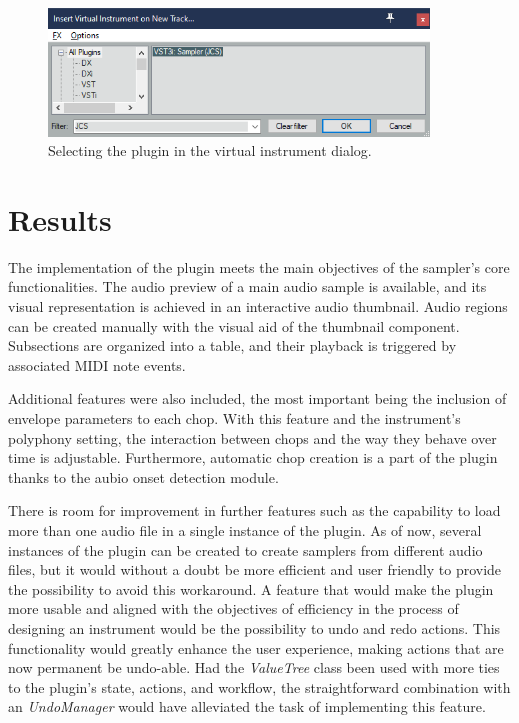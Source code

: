 \documentclass[12pt, a4paper, hidelinks]{article}
\begin{document}
	\begin{figure}[h]
		\centering
		\includegraphics[width=0.9\textwidth]{u/load.png}
		\caption{Selecting the plugin in the virtual instrument dialog.}
		\label{fig:load}
	\end{figure}
	
	\newpage
	\section{Results}
	The implementation of the plugin meets the main objectives of the sampler's core functionalities. The audio preview of a main audio sample is available, and its visual representation is achieved in an interactive audio thumbnail. Audio regions can be created manually with the visual aid of the thumbnail component. Subsections are organized into a table, and their playback is triggered by associated MIDI note events. \par 
	Additional features were also included, the most important being the inclusion of envelope parameters to each chop. With this feature and the instrument's polyphony setting, the interaction between chops and the way they behave over time is adjustable. Furthermore, automatic chop creation is a part of the plugin thanks to the aubio onset detection module\cite{aubioonset}.\par
		
	There is room for improvement in further features such as the capability to load more than one audio file in a single instance of the plugin. As of now, several instances of the plugin can be created to create samplers from different audio files, but it would without a doubt be more efficient and user friendly to provide the possibility to avoid this workaround. A feature that would make the plugin more usable and aligned with the objectives of efficiency in the process of designing an instrument would be the possibility to undo and redo actions. This functionality would greatly enhance the user experience, making actions that are now permanent be undo-able. Had the \textit{ValueTree} class been used with more ties to the plugin's state, actions, and workflow, the straightforward combination with an \textit{UndoManager} would have alleviated the task of implementing this feature.\par 
	
\end{document}
